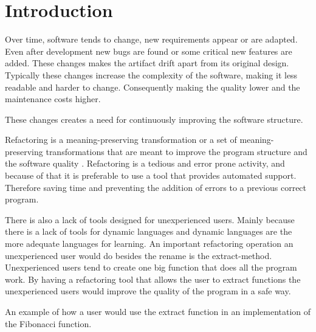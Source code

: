 
% 
% 

\section{Introduction}


Over time, software tends to change, new requirements appear or are adapted. 
Even after development new bugs are found or some critical new features are added.
These changes makes the artifact drift apart from its original design.
Typically these changes increase the complexity of the software, making it less readable and harder to change. 
Consequently making the quality lower and the maintenance costs higher.

These changes creates a need for continuously improving the software structure.

Refactoring is a meaning-preserving transformation or a set of meaning-preserving transformations that are meant to improve the program structure and the software quality \cite{bourquin2007high}.
Refactoring is a tedious and error prone activity, and because of that it is preferable to use a tool that provides automated support. %
Therefore saving time and preventing the addition of errors to a previous correct program.

%
There is also a lack of tools designed for unexperienced users. 
Mainly because there is a lack of tools for dynamic languages and dynamic languages are the more adequate languages for learning.
An important refactoring operation an unexperienced user would do besides the rename is the extract-method. 
Unexperienced users tend to create one big function that does all the program work.
By having a refactoring tool that allows the user to extract functions the unexperienced users would improve the quality of the program in a safe way.

An example of how a user would use the extract function in an implementation of the Fibonacci function.

